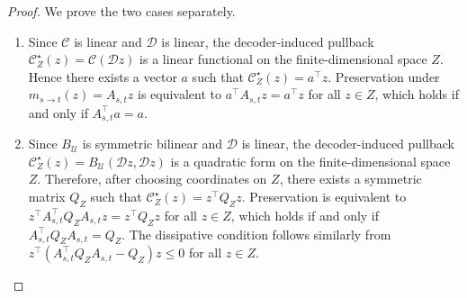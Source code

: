 \documentclass[a4paper,fleqn]{cas-sc}
\theoremstyle{thmstyleone}%
\theoremstyle{thmstyletwo}%
\theoremstyle{thmstylethree}%
\begin{document}
\begin{proof}
We prove the two cases separately.

\begin{enumerate}
    \item Since $\mathcal C$ is linear and $\mathcal D$ is linear, the
    decoder-induced pullback $\mathcal C_Z^\star(z)=\mathcal C(\mathcal D z)$ is a linear functional on the finite-dimensional space $Z$. Hence there exists a vector $a$ such that $\mathcal C_Z^\star(z)=a^\top z$. Preservation under $m_{s\to t}(z)=A_{s,t}z$ is equivalent to $a^\top A_{s,t}z=a^\top z$ for all $z\in Z$, which holds if and only if $A_{s,t}^\top a=a$.

    \item Since $B_{\mathcal U}$ is symmetric bilinear and $\mathcal D$ is linear, the decoder-induced pullback $\mathcal C_Z^\star(z)=B_{\mathcal U}(\mathcal D z,\mathcal D z)$ is a quadratic form on the finite-dimensional space $Z$. Therefore, after choosing coordinates on $Z$, there exists a symmetric matrix $Q_Z$ such that $\mathcal C_Z^\star(z)=z^\top Q_Zz$. Preservation is equivalent to $z^\top A_{s,t}^\top Q_ZA_{s,t}z=z^\top Q_Zz$ for all $z\in Z$, which holds if and only if $A_{s,t}^\top Q_ZA_{s,t}=Q_Z$. The dissipative condition follows similarly from $z^\top(A_{s,t}^\top Q_ZA_{s,t}-Q_Z)z\le 0$ for all $z\in Z$.
\end{enumerate}
\end{proof}
\end{document}
